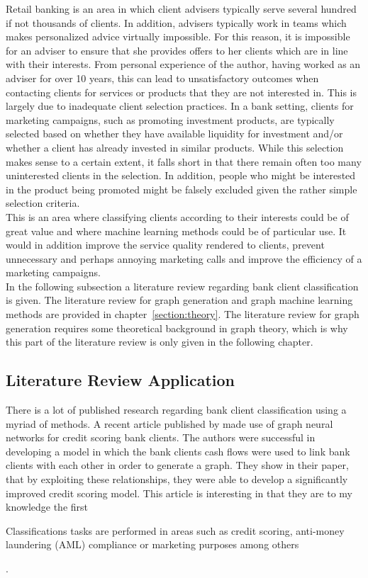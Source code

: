 	Retail banking is an area in which client advisers typically serve several 
	hundred if not thousands of clients. In addition, advisers typically work
	in teams which makes personalized advice virtually impossible. For this 
	reason, it is impossible for an adviser to ensure that she provides offers
	to her clients which are in line with their interests. From personal
	experience of the author, having worked as an adviser for over 10 years, 
	this can lead to unsatisfactory outcomes when contacting clients for services or 
	products that they are not interested in. This is largely due to inadequate
	client selection practices. In a bank setting, clients for marketing 
	campaigns, such as promoting investment products, are typically selected based
	on whether they have available liquidity for investment and/or whether a 
	client has already invested in similar products. While this selection makes
	sense to a certain extent, it falls short in that there remain often too 
	many uninterested clients in the selection. In addition, people who might 
	be interested in the product being promoted might be falsely excluded given 
	the rather simple selection criteria. \\
	

	\noindent This is an area where classifying clients according to their 
	interests could be of great value and where machine learning methods could 
	be of particular use. It would in addition improve the service quality 
	rendered to clients, prevent unnecessary and perhaps annoying marketing 
	calls and improve the efficiency of a marketing campaigns. \\

	\noindent In the following subsection a literature review regarding bank
	client classification is given. The literature review for graph generation
	and graph machine learning methods are provided in
	chapter~\ref{section:theory}. The literature review for graph generation
	requires some theoretical background in graph theory, which is why this
	part of the literature review is only given in the following chapter.  
	
	\subsection{Literature Review Application}

	There is a lot of published research regarding bank client classification
	using a myriad of methods. A recent article published by
	\cite{sukharev2020ews} made use of graph neural networks for credit scoring
	bank clients. The authors were successful in developing a model in which
	the bank clients cash flows were used to link bank clients with each other
	in order to generate a graph. They show in their paper, that by exploiting
	these relationships, they were able to develop a significantly improved
	credit scoring model. This article is interesting in that they are to my
	knowledge the first 


	Classifications tasks are performed in areas
	such as credit scoring, anti-money laundering (AML) compliance or marketing
	purposes among others
	


	\citep{weber2018scalable,moro2014data}.



